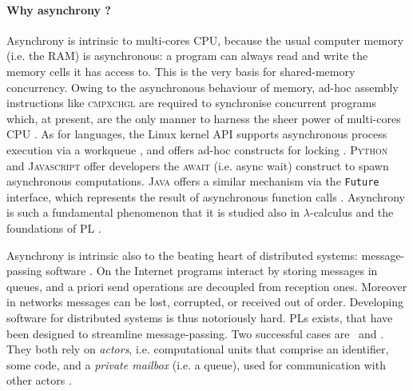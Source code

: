 \paragraph{Why asynchrony ?}
Asynchrony is intrinsic to multi-cores CPU, because
the usual computer memory (i.e. the RAM) is asynchronous:
a program can always read and write the memory cells it
has access to. This is the very basis for shared-memory concurrency.
Owing to the asynchronous behaviour of memory, ad-hoc assembly
instructions like \textsc{cmpxchgl} \cite{WkCAS} are required to
synchronise concurrent programs which, at present, are
the only manner to harness the sheer power of multi-cores CPU
\cite{doi:10.1126/science.aam9744}.
As for languages, the Linux kernel API supports asynchronous process execution via a workqueue \cite{workqueue}, and offers ad-hoc
constructs for locking \cite{locktypes}.
\textsc{Python} and \textsc{Javascript} offer developers the
\textsc{await} (i.e. async wait) construct to spawn asynchronous
computations. \textsc{Java} offers a similar mechanism via the 
\texttt{Future} interface, which represents the result of asynchronous
function calls \cite{java.future}.
Asynchrony is such a fundamental phenomenon that it is studied also
in $\lambda$-calculus and the foundations of PL \cite{DBLP:journals/lmcs/AhmanP24}.

Asynchrony is intrinsic also to
the beating heart of distributed systems: message-passing software
\cite{10.5555/2517679}.
On the Internet programs interact by storing messages in queues,
and a priori send operations are decoupled from reception ones.
Moreover in networks messages can be lost, corrupted, or received
out of order.
Developing software for distributed systems is thus notoriously
hard. PLs exists, that have been designed to streamline message-passing.
Two successful cases are \erlang\ and \elixir. They both rely on {\em
  actors}, i.e. computational units that
comprise an identifier, some code, and a {\em private mailbox} (i.e. a queue),
used for communication with other actors \cite{DBLP:journals/jfp/AghaMST97}.







